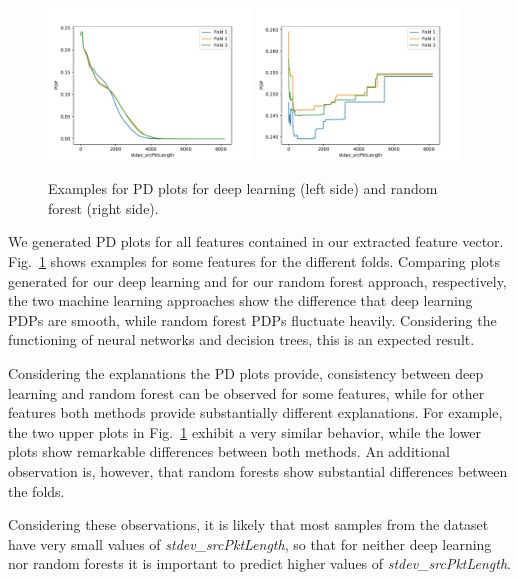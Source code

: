 \documentclass[10pt,sigconf,letterpaper]{acmart}
\begin{document}
\begin{figure}[p]
\includegraphics[width=0.48\textwidth]{../pdp/apply(stdev(ipTotalLength),forward)_nn.pdf}
\includegraphics[width=0.48\textwidth]{../pdp/apply(stdev(ipTotalLength),forward)_rf.pdf}

\caption{Examples for PD plots for deep learning (left side) and random forest (right side).}
\label{fig:pdp}
\end{figure}

We generated PD plots for all features contained in our extracted feature vector. Fig.~\ref{fig:pdp} shows examples for some features for the different folds. Comparing plots generated for our deep learning and for our random forest approach, respectively, the two machine learning approaches show the difference that deep learning PDPs are smooth, while random forest PDPs fluctuate heavily. Considering the functioning of neural networks and decision trees, this is an expected result.

Considering the explanations the PD plots provide, consistency between deep learning and random forest can be observed for some features, while for other features both methods provide substantially different explanations. For example, the two upper plots in Fig.~\ref{fig:pdp} exhibit a very similar behavior, while the lower plots show remarkable differences between both methods. An additional observation is, however, that random forests show substantial differences between the folds. 

Considering these observations, it is likely that most samples from the dataset have very small values of \textit{stdev\_srcPktLength}, so that for neither deep learning nor random forests it is important to predict higher values of \textit{stdev\_srcPktLength}. 
\end{document}
